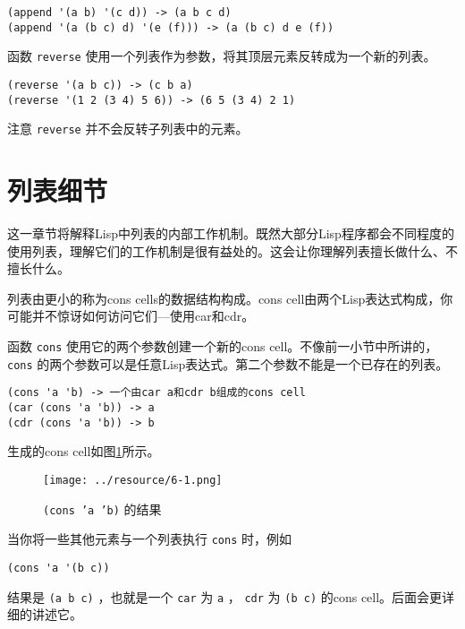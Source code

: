 \begin{verbatim}
(append '(a b) '(c d)) -> (a b c d)
(append '(a (b c) d) '(e (f))) -> (a (b c) d e (f))
\end{verbatim}

函数 \texttt{reverse} 使用一个列表作为参数，将其顶层元素反转成为一个新的列表。

\begin{verbatim}
(reverse '(a b c)) -> (c b a)
(reverse '(1 2 (3 4) 5 6)) -> (6 5 (3 4) 2 1)
\end{verbatim}

注意 \texttt{reverse} 并不会反转子列表中的元素。

\section{列表细节}
\label{section:06-List-Details}

这一章节将解释Lisp中列表的内部工作机制。既然大部分Lisp程序都会不同程度的使用列表，理解它们的工作机制是很有益处的。这会让你理解列表擅长做什么、不擅长什么。

列表由更小的称为cons cells的数据结构构成。cons cell由两个Lisp表达式构成，你可能并不惊讶如何访问它们---使用car和cdr。

函数 \texttt{cons} 使用它的两个参数创建一个新的cons cell。不像前一小节中所讲的， \texttt{cons} 的两个参数可以是任意Lisp表达式。第二个参数不能是一个已存在的列表。

\begin{verbatim}
(cons 'a 'b) -> 一个由car a和cdr b组成的cons cell
(car (cons 'a 'b)) -> a
(cdr (cons 'a 'b)) -> b
\end{verbatim}

生成的cons cell如图\ref{figure:result-of-cons-a-b}所示。

\begin{figure}[hbt!]
  \texttt{[image: ../resource/6-1.png]}
  \caption{ \texttt{(cons 'a 'b)} 的结果}
  \label{figure:result-of-cons-a-b}
\end{figure}

当你将一些其他元素与一个列表执行 \texttt{cons} 时，例如

\begin{verbatim}
(cons 'a '(b c))
\end{verbatim}

结果是 \texttt{(a b c)} ，也就是一个 \texttt{car} 为 \texttt{a} ， \texttt{cdr} 为 \texttt{(b c)} 的cons cell。后面会更详细的讲述它。

